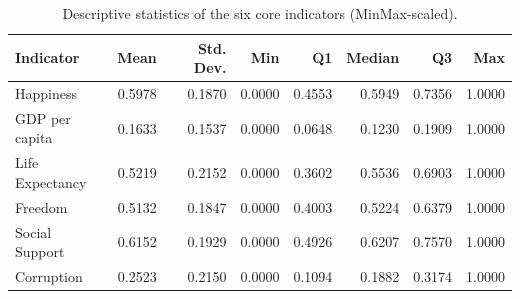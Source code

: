 \begin{table}
\caption{Descriptive statistics of the six core indicators (MinMax-scaled).}
\label{tab:descriptive}
\begin{tabular}{lrrrrrrr}
\toprule
Indicator & Mean & Std. Dev. & Min & Q1 & Median & Q3 & Max \\
\midrule
Happiness & 0.5978 & 0.1870 & 0.0000 & 0.4553 & 0.5949 & 0.7356 & 1.0000 \\
GDP per capita & 0.1633 & 0.1537 & 0.0000 & 0.0648 & 0.1230 & 0.1909 & 1.0000 \\
Life Expectancy & 0.5219 & 0.2152 & 0.0000 & 0.3602 & 0.5536 & 0.6903 & 1.0000 \\
Freedom & 0.5132 & 0.1847 & 0.0000 & 0.4003 & 0.5224 & 0.6379 & 1.0000 \\
Social Support & 0.6152 & 0.1929 & 0.0000 & 0.4926 & 0.6207 & 0.7570 & 1.0000 \\
Corruption & 0.2523 & 0.2150 & 0.0000 & 0.1094 & 0.1882 & 0.3174 & 1.0000 \\
\bottomrule
\end{tabular}
\end{table}
